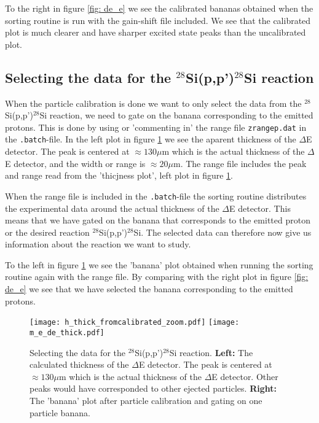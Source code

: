 \documentclass[11pt,a4wide]{article}
\begin{document}
To the right in figure \ref{fig: de_e} we see the calibrated bananas obtained when the sorting routine is run with the gain-shift file included. We see that the calibrated plot is much clearer and have sharper excited state peaks than the uncalibrated plot. 

\subsection{Selecting the data for the ${}^{28}$Si(p,p')$^{28}$Si reaction}
When the particle calibration is done we want to only select the data from the ${}^{28}$Si(p,p')$^{28}$Si reaction, we need to gate on the banana corresponding to the emitted protons. This is done by using or 'commenting in' the range file \texttt{zrangep.dat} in the \texttt{.batch}-file. In the left plot in figure \ref{fig: banana_gate} we see the aparent thickness of the $\Delta$E detector. The peak is centered at $\approx 130 \mu$m which is the actual thickness of the $\Delta$E detector, and the width or range is $\approx 20\mu$m. The range file includes the peak and range read from the 'thicjness plot', left plot in figure \ref{fig: banana_gate}. 

When the range file is included in the \texttt{.batch}-file the sorting routine distributes the experimental data around the actual thickness of the $\Delta$E detector. This means that we have gated on the banana that corresponds to the emitted proton or the desired reaction ${}^{28}$Si(p,p')$^{28}$Si. The selected data can therefore now give us information about the reaction we want to study. 

To the left in figure \ref{fig: banana_gate} we see the 'banana' plot obtained when running the sorting routine again with the range file. By comparing with the right plot in figure \ref{fig: de_e} we see that we have selected the banana corresponding to the emitted protons. 

\begin{figure}[htp]
\centering 
\texttt{[image: h\_thick\_fromcalibrated\_zoom.pdf]}
\texttt{[image: m\_e\_de\_thick.pdf]}
\caption{Selecting the data for the ${}^{28}$Si(p,p')$^{28}$Si reaction. \textbf{Left:} The calculated thickness of the $\Delta$E detector. The peak is centered at $\approx 130 \mu$m which is the actual thickness of the $\Delta$E detector. Other peaks would have corresponded to other ejected particles. \textbf{Right:} The 'banana' plot after particle calibration and gating on one particle banana.}
\label{fig: banana_gate}
\end{figure}
\end{document}
